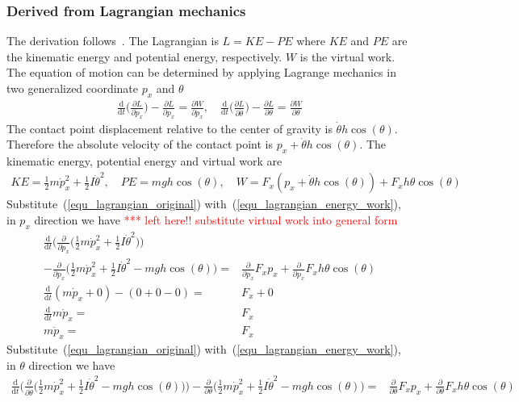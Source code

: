 \documentclass[12pt]{article}
\begin{document}
\subsubsection{Derived from Lagrangian mechanics}
The derivation follows~\cite{peacock_2007_mit_lagrange}.
The Lagrangian is $L=KE-PE$ where $KE$ and $PE$ are the
kinematic energy and potential energy, respectively.
$W$ is the virtual work.
The equation of motion can be determined by applying
Lagrange mechanics in two generalized coordinate $p_x$ and $\theta$
\begin{align}
\label{equ_lagrangian_original}
\frac{\mathrm{d}}{\mathrm{d}t}\bigg(
\frac{\partial L}{\partial \dot{p}_x}\bigg)
-\frac{\partial L}{\partial p_x}=
\frac{\partial W}{\partial p_x}, \quad
\frac{\mathrm{d}}{\mathrm{d}t}\bigg(
\frac{\partial L}{\partial \dot{\theta}}\bigg)
-\frac{\partial L}{\partial \theta}=
\frac{\partial W}{\partial \theta}
\end{align}
The contact point displacement relative to the center of gravity is
$\dot{\theta}h\cos(\theta)$. Therefore the absolute velocity of
the contact point is $p_x + \dot{\theta}h\cos(\theta)$.
The kinematic energy, potential energy and virtual work are
\begin{align}
KE = \frac{1}{2}m\dot{p}_x^2
+\frac{1}{2}I\dot{\theta}^2,\quad
PE = mgh\cos(\theta), \quad
W = F_x (p_x+ \dot{\theta}h\cos(\theta)) + F_x h \theta \cos(\theta)
\label{equ_lagrangian_energy_work}
\end{align}
Substitute~(\ref{equ_lagrangian_original})
with~(\ref{equ_lagrangian_energy_work}), in $p_x$ direction we have
\textcolor{red}{*** left here!! substitute virtual work into general form}
\begin{align}
\frac{\mathrm{d}}{\mathrm{d}t}\bigg(
\frac{\partial}{\partial \dot{p}_x}\bigg(
\frac{1}{2}m\dot{p}_x^2 + \frac{1}{2}I\dot{\theta}^2\bigg)\bigg) \quad &\\
-\frac{\partial}{\partial p_x}\bigg(
\frac{1}{2}m\dot{p}_x^2+\frac{1}{2}I\dot{\theta}^2
-mgh\cos(\theta)\bigg)=&
\frac{\partial}{\partial p_x}F_x p_x 
+\frac{\partial}{\partial p_x} F_x h \theta \cos(\theta) \\
\frac{\mathrm{d}}{\mathrm{d}t}
(m\dot{p}_x + 0)
-(0+0-0)=&
F_x + 0\\
\frac{\mathrm{d}}{\mathrm{d}t}
m\dot{p}_x = & F_x \\
m\ddot{p}_x =& F_x
\end{align}
Substitute~(\ref{equ_lagrangian_original})
with~(\ref{equ_lagrangian_energy_work}), in $\theta$ direction we have
\begin{align}
\frac{\mathrm{d}}{\mathrm{d}t}\bigg(
\frac{\partial}{\partial\dot{\theta}}\bigg(
\frac{1}{2}m\dot{p}_x^2+\frac{1}{2}I\dot{\theta}^2
-mgh\cos(\theta)\bigg)\bigg)
-\frac{\partial}{\partial \theta}\bigg(
\frac{1}{2}m\dot{p}_x^2+\frac{1}{2}I\dot{\theta}^2
-mgh\cos(\theta)\bigg)=&
\frac{\partial}{\partial \theta}F_x p_x 
+\frac{\partial}{\partial \theta} F_x h \theta \cos(\theta)
\end{align}
\end{document}
